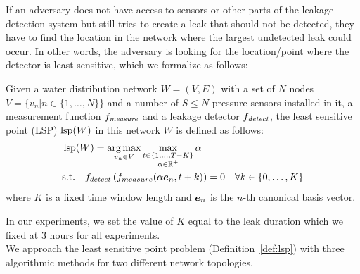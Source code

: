 If an adversary does not have access to sensors or other parts of the leakage detection system but still tries to create a leak that should not be detected, they have to find the location in the network where the largest undetected leak could occur. In other words, the adversary is looking for the location/point where the detector is least sensitive, which we formalize as follows:
\begin{definition}\label{def:lsp}
Given a water distribution network $W = (V,E)$ with
a set of $N$ nodes $V = \{ v_n | n \in \{ 1, \hdots, N \} \}$ and
a number of $S \leq N$ pressure sensors installed in it,
a measurement function $f_{\mathit{measure}}$ and a leakage detector $f_{\mathit{detect}}$,
the least sensitive point (LSP) $\operatorname{lsp}(W)$ in this network $W$ is defined as follows:
\begin{equation}
\begin{split}
& \operatorname{lsp} (W) = \operatorname*{arg\,max}_{v_n \in V } \max_{\substack{t \in \{ 1, \hdots, T - K \} \\ \alpha \in \mathbb{R}^+}} \alpha\\
& \text{s.t.} \quad f_{detect} \left( f_{measure}(\alpha \bm{e}_n, t+k )\right) = 0 \quad \forall k \in \{ 0, \hdots, K \}
\end{split}
\label{lsp}
\end{equation}
where $K$ is a fixed time window length and $\bm{e}_n$ is the $n$-th canonical basis vector.
\end{definition}
In our experiments, we set the value of $K$ equal to the leak duration which
we fixed at 3 hours for all experiments.\\
We approach the least sensitive point problem (Definition~\ref{def:lsp}) with three algorithmic methods for two different network topologies.

